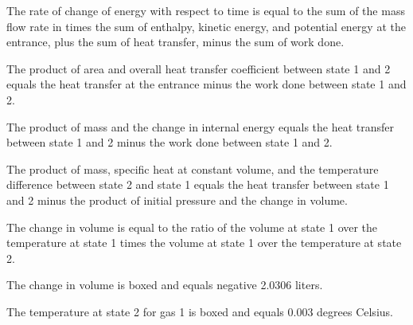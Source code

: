 The rate of change of energy with respect to time is equal to the sum of the mass flow rate in times the sum of enthalpy, kinetic energy, and potential energy at the entrance, plus the sum of heat transfer, minus the sum of work done.

The product of area and overall heat transfer coefficient between state 1 and 2 equals the heat transfer at the entrance minus the work done between state 1 and 2.

The product of mass and the change in internal energy equals the heat transfer between state 1 and 2 minus the work done between state 1 and 2.

The product of mass, specific heat at constant volume, and the temperature difference between state 2 and state 1 equals the heat transfer between state 1 and 2 minus the product of initial pressure and the change in volume.

The change in volume is equal to the ratio of the volume at state 1 over the temperature at state 1 times the volume at state 1 over the temperature at state 2.

The change in volume is boxed and equals negative 2.0306 liters.

The temperature at state 2 for gas 1 is boxed and equals 0.003 degrees Celsius.